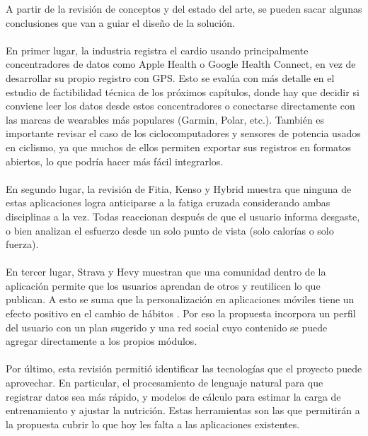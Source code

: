 A partir de la revisión de conceptos y del estado del arte, se pueden sacar algunas conclusiones que van a guiar el diseño de la solución.
\\\\
En primer lugar, la industria registra el cardio usando principalmente concentradores de datos como Apple Health o Google Health Connect, en vez de desarrollar su propio registro con GPS. Esto se evalúa con más detalle en el estudio de factibilidad técnica de los próximos capítulos, donde hay que decidir si conviene leer los datos desde estos concentradores o conectarse directamente con las marcas de wearables más populares (Garmin, Polar, etc.). También es importante revisar el caso de los ciclocomputadores y sensores de potencia usados en ciclismo, ya que muchos de ellos permiten exportar sus registros en formatos abiertos, lo que podría hacer más fácil integrarlos.
\\\\
En segundo lugar, la revisión de Fitia, Kenso y Hybrid muestra que ninguna de estas aplicaciones logra anticiparse a la fatiga cruzada considerando ambas disciplinas a la vez. Todas reaccionan después de que el usuario informa desgaste, o bien analizan el esfuerzo desde un solo punto de vista (solo calorías o solo fuerza).
\\\\
En tercer lugar, Strava y Hevy muestran que una comunidad dentro de la aplicación permite que los usuarios aprendan de otros y reutilicen lo que publican. A esto se suma que la personalización en aplicaciones móviles tiene un efecto positivo en el cambio de hábitos \citep{tong2021personalized}. Por eso la propuesta incorpora un perfil del usuario con un plan sugerido y una red social cuyo contenido se puede agregar directamente a los propios módulos.
\\\\
Por último, esta revisión permitió identificar las tecnologías que el proyecto puede aprovechar. En particular, el procesamiento de lenguaje natural para que registrar datos sea más rápido, y modelos de cálculo para estimar la carga de entrenamiento y ajustar la nutrición. Estas herramientas son las que permitirán a la propuesta cubrir lo que hoy les falta a las aplicaciones existentes.

